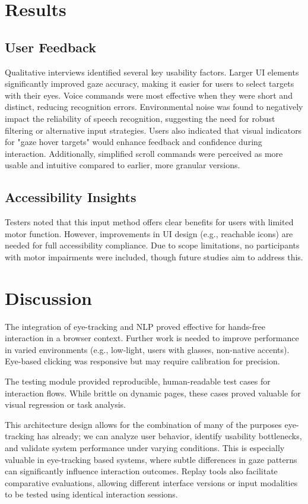 \section{Results}

\subsection{User Feedback}

Qualitative interviews identified several key usability factors. Larger UI elements significantly improved gaze accuracy, making it easier for users to select targets with their eyes. Voice commands were most effective when they were short and distinct, reducing recognition errors. Environmental noise was found to negatively impact the reliability of speech recognition, suggesting the need for robust filtering or alternative input strategies. Users also indicated that visual indicators for "gaze hover targets" would enhance feedback and confidence during interaction. Additionally, simplified scroll commands were perceived as more usable and intuitive compared to earlier, more granular versions.

\subsection{Accessibility Insights}

Testers noted that this input method offers clear benefits for users with limited motor function. However, improvements in UI design (e.g., reachable icons) are needed for full accessibility compliance. Due to scope limitations, no participants with motor impairments were included, though future studies aim to address this.

\section{Discussion}

The integration of eye-tracking and NLP proved effective for hands-free interaction in a browser context. Further work is needed to improve performance in varied environments (e.g., low-light, users with glasses, non-native accents). Eye-based clicking was responsive but may require calibration for precision.

The testing module provided reproducible, human-readable test cases for interaction flows. While brittle on dynamic pages, these cases proved valuable for visual regression or task analysis. 

This architecture design allows for the combination of many of the purposes eye-tracking has already; we can analyze user behavior, identify usability bottlenecks, and validate system performance under varying conditions. This is especially valuable in eye-tracking based systems, where subtle differences in gaze patterns can significantly influence interaction outcomes. Replay tools also facilitate comparative evaluations, allowing different interface versions or input modalities to be tested using identical interaction sessions.


